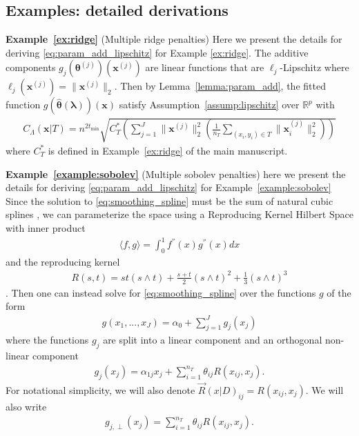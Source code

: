 \documentclass[10pt]{book}
\theoremstyle{definition}
\begin{document}
\subsection{Examples: detailed derivations}

\noindent \textbf{Example~\ref{ex:ridge}} (Multiple ridge penalties)
Here we present the details for deriving \eqref{eq:param_add_lipschitz} for Example \ref{ex:ridge}.
The additive components $g_j(\boldsymbol{\theta}^{(j)})(\boldsymbol{x}^{(j)})$ are linear functions that are $\ell_j$-Lipschitz where $\ell_j(\boldsymbol{x}^{(j)}) = \|\boldsymbol{x}^{(j)}\|_2$.
Then by Lemma~\ref{lemma:param_add}, the fitted function $g(\hat{\boldsymbol{\theta}}(\boldsymbol{\lambda}))(\boldsymbol{x})$ satisfy Assumption~\ref{assump:lipschitz} over $\mathbb{R}^p$ with
\begin{align}
C_\Lambda \left ( \boldsymbol{x} | T \right ) =
n^{2t_{\min}}
\sqrt{
	C^*_{T}
	\left(
	\sum_{j = 1}^J
	\|\boldsymbol{x}^{(j)}\|_2^2
	\left(\frac{1}{n_T} \sum_{(x_i, y_i) \in T} \|\boldsymbol{x}_i^{(j)}\|^2_2\right)
	\right)
}
\label{eq:ex_ridge}
\end{align}
where $C^*_{T}$ is defined in Example~\ref{ex:ridge} of the main manuscript.

\noindent \textbf{Example~\ref{example:sobolev}} (Multiple sobolev penalties)
here we present the details for deriving \eqref{eq:param_add_lipschitz} for Example~\ref{example:sobolev}
	Since the solution to \eqref{eq:smoothing_spline} must be the sum of natural cubic splines \citep{buja1989linear}, we can parameterize the space using a Reproducing Kernel Hilbert Space with inner product
	\begin{align}
	\langle f, g \rangle = \int_{0}^1 f^{''}(x) g^{''}(x) dx
	\end{align}
	and the reproducing kernel
	\begin{align}
	R(s, t) = st(s \wedge t)
	+ \frac{s + t}{2} (s \wedge t)^2
	+ \frac{1}{3}
	(s \wedge t)^3
	\end{align}
	\citep{heckman2012theory}.
	Then one can instead solve for \eqref{eq:smoothing_spline} over the functions $g$ of the form
	\begin{align}
	g(x_1,..., x_J) = \alpha_0 + \sum_{j=1}^J g_j(x_j)
	\end{align}
	where the functions $g_j$ are split into a linear component and an orthogonal non-linear component
	\begin{align}
	g_j(x_j) = \alpha_{1j} x_j + \sum_{i=1}^{n_T} \theta_{ij} R(x_{ij}, x_j).
	\end{align}
	For notational simplicity, we will also denote $\vec{R}(x | D)_{ij} = R(x_{ij}, x_j)$.
	We will also write
	\begin{align}
	g_{j, \perp}(x_j) = \sum_{i=1}^{n_T} \theta_{ij} R(x_{ij}, x_j).
	\end{align}
	
\end{document}
